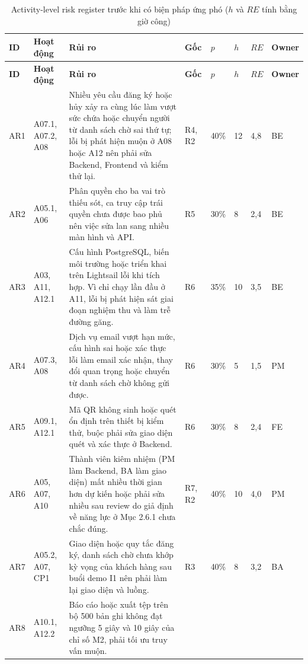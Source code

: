 {\small
\begin{longtable}{@{}Y{1.0cm}Y{1.8cm}Y{4.6cm}Y{1.0cm}Y{0.9cm}Y{0.8cm}Y{0.9cm}Y{1.3cm}@{}}
\caption{Activity-level risk register trước khi có biện pháp ứng phó ($h$ và $RE$ tính bằng giờ công)}\label{tab:p28-register}\\
\toprule
\textbf{ID} & \textbf{Hoạt động} & \textbf{Rủi ro} & \textbf{Gốc} & \textbf{$p$} & \textbf{$h$} & \textbf{$RE$} & \textbf{Owner} \\
\midrule
\endfirsthead
\toprule
\textbf{ID} & \textbf{Hoạt động} & \textbf{Rủi ro} & \textbf{Gốc} & \textbf{$p$} & \textbf{$h$} & \textbf{$RE$} & \textbf{Owner} \\
\midrule
\endhead
\bottomrule
\endfoot
AR1 & A07.1, A07.2, A08 &
Nhiều yêu cầu đăng ký hoặc hủy xảy ra cùng lúc làm vượt sức chứa hoặc chuyển người từ danh sách chờ sai thứ tự; lỗi bị phát hiện muộn ở A08 hoặc A12 nên phải sửa Backend, Frontend và kiểm thử lại. &
R4, R2 & 40\% & 12 & 4,8 & BE \\
\addlinespace
AR2 & A05.1, A06 &
Phân quyền cho ba vai trò thiếu sót, ca truy cập trái quyền chưa được bao phủ nên việc sửa lan sang nhiều màn hình và API. &
R5 & 30\% & 8 & 2,4 & BE \\
\addlinespace
AR3 & A03, A11, A12.1 &
Cấu hình PostgreSQL, biến môi trường hoặc triển khai trên Lightsail lỗi khi tích hợp. Vì chỉ chạy lần đầu ở A11, lỗi bị phát hiện sát giai đoạn nghiệm thu và làm trễ đường găng. &
R6 & 35\% & 10 & 3,5 & BE \\
\addlinespace
AR4 & A07.3, A08 &
Dịch vụ email vượt hạn mức, cấu hình sai hoặc xác thực lỗi làm email xác nhận, thay đổi quan trọng hoặc chuyển từ danh sách chờ không gửi được. &
R6 & 30\% & 5 & 1,5 & PM \\
\addlinespace
AR5 & A09.1, A12.1 &
Mã QR không sinh hoặc quét ổn định trên thiết bị kiểm thử, buộc phải sửa giao diện quét và xác thực ở Backend. &
R6 & 30\% & 8 & 2,4 & FE \\
\addlinespace
AR6 & A05, A07, A10 &
Thành viên kiêm nhiệm (PM làm Backend, BA làm giao diện) mất nhiều thời gian hơn dự kiến hoặc phải sửa nhiều sau review do giả định về năng lực ở Mục 2.6.1 chưa chắc đúng. &
R7, R2 & 40\% & 10 & 4,0 & PM \\
\addlinespace
AR7 & A05.2, A07, CP1 &
Giao diện hoặc quy tắc đăng ký, danh sách chờ chưa khớp kỳ vọng của khách hàng sau buổi demo I1 nên phải làm lại giao diện và luồng. &
R3 & 40\% & 8 & 3,2 & BA \\
\addlinespace
AR8 & A10.1, A12.2 &
Báo cáo hoặc xuất tệp trên bộ 500 bản ghi không đạt ngưỡng 5 giây và 10 giây của chỉ số M2, phải tối ưu truy vấn muộn. &

\end{longtable}}
